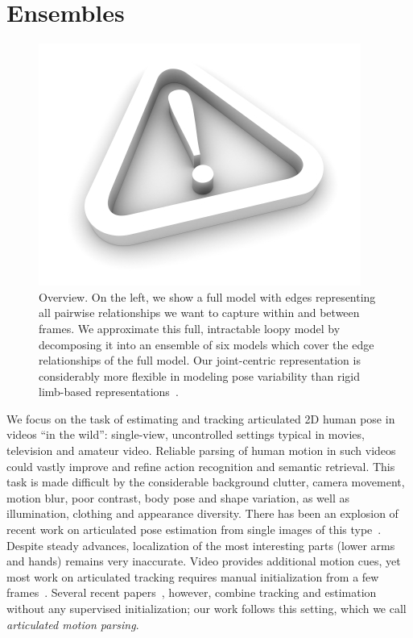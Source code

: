 \chapter{Ensembles} \label{sec:stretchable}


\begin{figure}[t!]
\centering
\includegraphics[width=0.99\linewidth]{figs/empty.jpg}
\caption{\small \label{fig:overview} Overview. On the left, we show a full model with edges representing all pairwise relationships we want to capture within and between frames.  We approximate this full, intractable loopy model by decomposing it into an ensemble of six models which cover the edge relationships of the full model.  Our joint-centric representation is considerably more flexible in modeling pose variability than rigid limb-based representations~\cite{ferrari08,sapp2010cascades,andriluka09}.}
\label{fig:overview}
\end{figure}


We focus on the task of estimating and tracking articulated 2D human pose in videos ``in the wild'': single-view, uncontrolled settings typical in movies, television and amateur video.   Reliable
parsing of human motion in such videos could vastly improve and refine action 
recognition and semantic retrieval. This task is made difficult by the 
considerable background clutter, camera movement, motion blur, poor contrast, 
body pose and shape variation, as well as illumination, clothing and appearance 
diversity. There has been an explosion of recent work on articulated pose 
estimation from single images of this type~\cite{ronfard02, 
miko04,felzps,ramanan06,ferrari08,eichner09, andriluka09,sapp2010cascades}.  
Despite steady advances, localization of the most interesting parts (lower arms 
and hands) remains very inaccurate.  Video provides additional motion cues, yet 
most work on articulated tracking requires manual initialization from a few
frames~\cite{cardboard02,bregler98,balan06,sminchisescu03,ren07,buehler08}.  
Several recent papers~\cite{sigal04, lan05,ramanan05,ferrari08,weisssapp10}, 
however, combine tracking and estimation without any supervised initialization; 
our work follows this setting, which we call {\em articulated motion parsing}.

